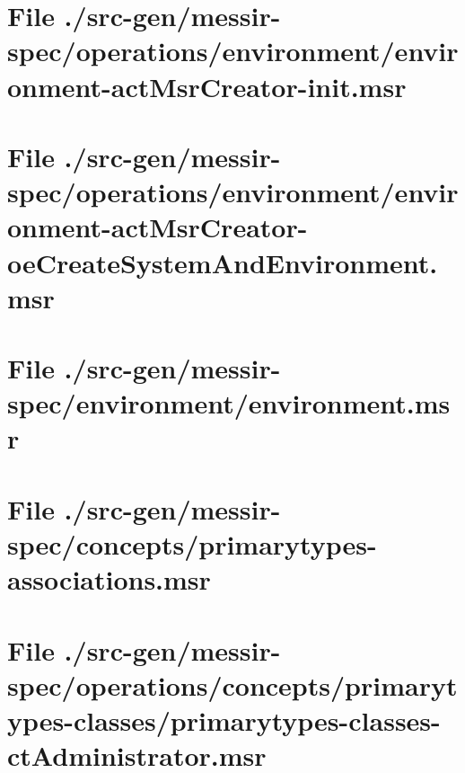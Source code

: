 \section[File /src-gen/messir-spec/operations.../environment-actMsrCreator-init.msr]{File ./src-gen/messir-spec/operations/environment/environment-actMsrCreator-init.msr}
\scriptsize

\normalsize
	
\section[File /src-gen.../environment-actMsrCreator-oeCreateSystemAndEnvironment.msr]{File ./src-gen/messir-spec/operations/environment/environment-actMsrCreator-oeCreateSystemAndEnvironment.msr}
\scriptsize

\normalsize
	
\section[File /src-gen/messir-spec/environment/environment.msr]{File ./src-gen/messir-spec/environment/environment.msr}
\scriptsize

\normalsize
	
\section[File /src-gen/messir-spec/concepts/primarytypes-associations.msr]{File ./src-gen/messir-spec/concepts/primarytypes-associations.msr}
\scriptsize

\normalsize
	
\section[File /src-gen/messir-spec.../primarytypes-classes-ctAdministrator.msr]{File ./src-gen/messir-spec/operations/concepts/primarytypes-classes/primarytypes-classes-ctAdministrator.msr}
\scriptsize

\normalsize
	
